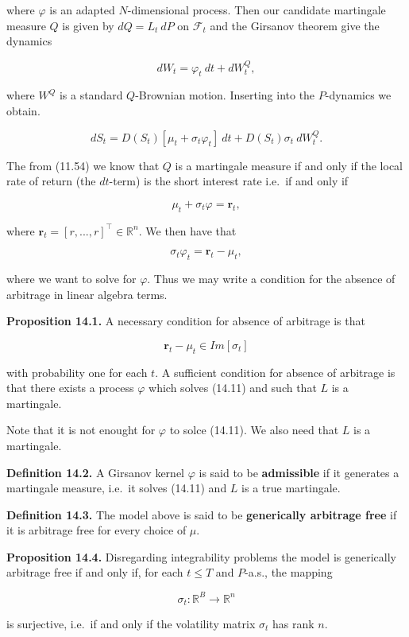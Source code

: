 \documentclass[
]{article}
\begin{document}
where \(\varphi\) is an adapted \(N\)-dimensional process. Then our
candidate martingale measure \(Q\) is given by \(dQ=L_t\ dP\) on
\(\mathcal{F}_t\) and the Girsanov theorem give the dynamics

\[
dW_t=\varphi_t\ dt+dW_t^Q,
\]

where \(W^Q\) is a standard \(Q\)-Brownian motion. Inserting into the
\(P\)-dynamics we obtain.

\[
dS_t=D(S_t)[\mu_t+\sigma_t\varphi_t]\ dt+D(S_t)\sigma_t\ dW_t^Q.
\]

The from (11.54) we know that \(Q\) is a martingale measure if and only
if the local rate of return (the \(dt\)-term) is the short interest rate
i.e.~if and only if

\[
\mu_t+\sigma_t\varphi=\mathbf{r}_t,
\]

where \(\mathbf{r}_t=[r,...,r]^\top\in\mathbb{R}^n\). We then have that

\[
\sigma_t\varphi_t = \mathbf{r}_t-\mu_t,\tag{14.11}
\]

where we want to solve for \(\varphi\). Thus we may write a condition
for the absence of arbitrage in linear algebra terms.

\textbf{Proposition 14.1.} A necessary condition for absence of
arbitrage is that

\[
\mathbf{r}_t-\mu_t\in Im[\sigma_t]
\]

with probability one for each \(t\). A sufficient condition for absence
of arbitrage is that there exists a process \(\varphi\) which solves
(14.11) and such that \(L\) is a martingale.

Note that it is not enought for \(\varphi\) to solce (14.11). We also
need that \(L\) is a martingale.

\textbf{Definition 14.2.} A Girsanov kernel \(\varphi\) is said to be
\textbf{admissible} if it generates a martingale measure, i.e.~it solves
(14.11) and \(L\) is a true martingale.

\textbf{Definition 14.3.} The model above is said to be
\textbf{generically arbitrage free} if it is arbitrage free for every
choice of \(\mu\).

\textbf{Proposition 14.4.} Disregarding integrability problems the model
is generically arbitrage free if and only if, for each \(t\le T\) and
\(P\)-a.s., the mapping

\[
\sigma_t : \mathbb{R}^B\to \mathbb{R}^n
\]

is surjective, i.e.~if and only if the volatility matrix \(\sigma_t\)
has rank \(n\).
\end{document}
